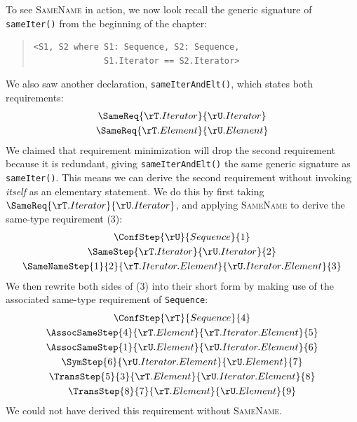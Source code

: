 \documentclass[../generics]{subfiles}
\begin{document}
\begin{example}\label{same name rule example}
To see \textsc{SameName} in action, we now look recall the generic signature of \texttt{sameIter()} from the beginning of the chapter:
\begin{quote}
\begin{verbatim}
<S1, S2 where S1: Sequence, S2: Sequence,
              S1.Iterator == S2.Iterator>
\end{verbatim}
\end{quote}
We also saw another declaration, \texttt{sameIterAndElt()}, which states both requirements:
\begin{gather*}
\SameReq{\rT.Iterator}{\rU.Iterator}\\
\SameReq{\rT.Element}{\rU.Element}
\end{gather*}
We claimed that requirement minimization will drop the second requirement because it is redundant, giving \texttt{sameIterAndElt()} the same generic signature as \texttt{sameIter()}. This means we can derive the second requirement without invoking \emph{itself} as an elementary statement. We do this by first taking $\SameReq{\rT.Iterator}{\rU.Iterator}$, and applying \textsc{SameName} to derive the same-type requirement (3):
\begin{gather*}
\ConfStep{\rU}{Sequence}{1}\\
\SameStep{\rT.Iterator}{\rU.Iterator}{2}\\
\SameNameStep{1}{2}{\rT.Iterator.Element}{\rU.Iterator.Element}{3}
\end{gather*}
We then rewrite both sides of (3) into their short form by making use of the associated same-type requirement of \texttt{Sequence}:
\begin{gather*}
\ConfStep{\rT}{Sequence}{4}\\
\AssocSameStep{4}{\rT.Element}{\rT.Iterator.Element}{5}\\
\AssocSameStep{1}{\rU.Element}{\rU.Iterator.Element}{6}\\
\SymStep{6}{\rU.Iterator.Element}{\rU.Element}{7}\\
\TransStep{5}{3}{\rT.Element}{\rU.Iterator.Element}{8}\\
\TransStep{8}{7}{\rT.Element}{\rU.Element}{9}
\end{gather*}
We could not have derived this requirement without \textsc{SameName}.
\end{example}
\end{document}
